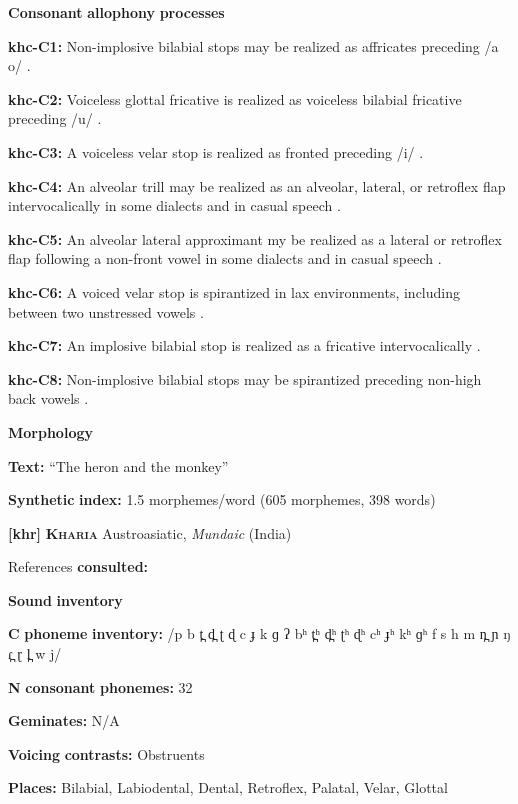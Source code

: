 \textbf{Consonant} \textbf{allophony} \textbf{processes}

\textbf{khc-C1:} Non-implosive bilabial stops may be realized as affricates preceding /a o/ \citep[16]{Donohue1999}.

\textbf{khc-C2:} Voiceless glottal fricative is realized as voiceless bilabial fricative preceding /u/ \citep[19]{Donohue1999}.

\textbf{khc-C3:} A voiceless velar stop is realized as fronted preceding /i/ \citep[19]{Donohue1999}.

\textbf{khc-C4:} An alveolar trill may be realized as an alveolar, lateral, or retroflex flap intervocalically in some dialects and in casual speech \citep[18]{Donohue1999}.

\textbf{khc-C5:} An alveolar lateral approximant my be realized as a lateral or retroflex flap following a non-front vowel in some dialects and in casual speech \citep[18]{Donohue1999}.

\textbf{khc-C6:} A voiced velar stop is spirantized in lax environments, including between two unstressed vowels \citep[27]{Donohue1999}.

\textbf{khc-C7:} An implosive bilabial stop is realized as a fricative intervocalically \citep[16]{Donohue1999}.

\textbf{khc-C8:} Non-implosive bilabial stops may be spirantized preceding non-high back vowels \citep[16]{Donohue1999}.

\textbf{Morphology}

\textbf{Text:} “The heron and the monkey” \citep[516-520]{Donohue1999}

\textbf{Synthetic} \textbf{index:} 1.5 morphemes/word (605 morphemes, 398 words)

\textbf{[khr]}   \textbf{\textsc{Kharia}}    Austroasiatic, \textit{Mundaic} (India)

References \textbf{consulted:} \citet{Peterson2011}

\textbf{Sound} \textbf{inventory}

\textbf{C} \textbf{phoneme} \textbf{inventory:} /p b t̪ d̪ ʈ ɖ c ɟ k ɡ ʔ bʰ t̪ʰ d̪ʰ ʈʰ ɖʰ cʰ ɟʰ kʰ ɡʰ f s h m n̪ ɲ ŋ ɾ̪ ɽ l̪ w j/

\textbf{N} \textbf{consonant} \textbf{phonemes:} 32

\textbf{Geminates:} N/A

\textbf{Voicing} \textbf{contrasts:} Obstruents

\textbf{Places:} Bilabial, Labiodental, Dental, Retroflex, Palatal, Velar, Glottal

